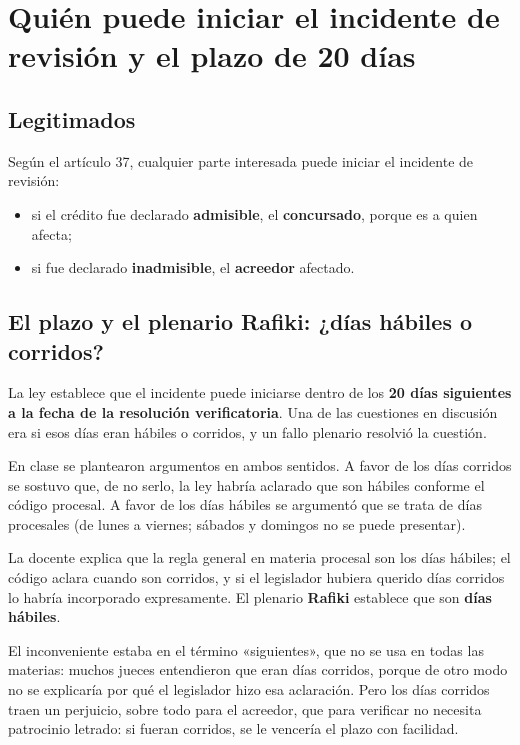 \documentclass[12pt,oneside]{book}
\begin{document}
\section{Quién puede iniciar el incidente de revisión y el plazo de 20 días}

\subsection{Legitimados}

Según el artículo 37, cualquier parte interesada puede iniciar el incidente de revisión:

\begin{itemize}
    \item si el crédito fue declarado \textbf{admisible}, el \textbf{concursado}, porque es a quien afecta;
    \item si fue declarado \textbf{inadmisible}, el \textbf{acreedor} afectado.
\end{itemize}

\subsection{El plazo y el plenario Rafiki: ¿días hábiles o corridos?}

La ley establece que el incidente puede iniciarse dentro de los \textbf{20 días siguientes a la fecha de la resolución verificatoria}. Una de las cuestiones en discusión era si esos días eran hábiles o corridos, y un fallo plenario resolvió la cuestión.

En clase se plantearon argumentos en ambos sentidos. A favor de los días corridos se sostuvo que, de no serlo, la ley habría aclarado que son hábiles conforme el código procesal. A favor de los días hábiles se argumentó que se trata de días procesales (de lunes a viernes; sábados y domingos no se puede presentar).

La docente explica que la regla general en materia procesal son los días hábiles; el código aclara cuando son corridos, y si el legislador hubiera querido días corridos lo habría incorporado expresamente. El plenario \textbf{Rafiki} establece que son \textbf{días hábiles}.

El inconveniente estaba en el término «siguientes», que no se usa en todas las materias: muchos jueces entendieron que eran días corridos, porque de otro modo no se explicaría por qué el legislador hizo esa aclaración. Pero los días corridos traen un perjuicio, sobre todo para el acreedor, que para verificar no necesita patrocinio letrado: si fueran corridos, se le vencería el plazo con facilidad.
\end{document}
